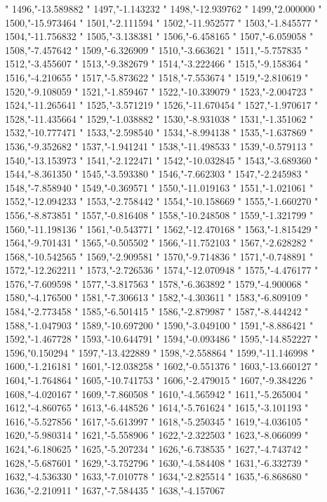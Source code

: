 "
1496,"-13.589882
"
1497,"-1.143232
"
1498,"-12.939762
"
1499,"2.000000
"
1500,"-15.973464
"
1501,"-2.111594
"
1502,"-11.952577
"
1503,"-1.845577
"
1504,"-11.756832
"
1505,"-3.138381
"
1506,"-6.458165
"
1507,"-6.059058
"
1508,"-7.457642
"
1509,"-6.326909
"
1510,"-3.663621
"
1511,"-5.757835
"
1512,"-3.455607
"
1513,"-9.382679
"
1514,"-3.222466
"
1515,"-9.158364
"
1516,"-4.210655
"
1517,"-5.873622
"
1518,"-7.553674
"
1519,"-2.810619
"
1520,"-9.108059
"
1521,"-1.859467
"
1522,"-10.339079
"
1523,"-2.004723
"
1524,"-11.265641
"
1525,"-3.571219
"
1526,"-11.670454
"
1527,"-1.970617
"
1528,"-11.435664
"
1529,"-1.038882
"
1530,"-8.931038
"
1531,"-1.351062
"
1532,"-10.777471
"
1533,"-2.598540
"
1534,"-8.994138
"
1535,"-1.637869
"
1536,"-9.352682
"
1537,"-1.941241
"
1538,"-11.498533
"
1539,"-0.579113
"
1540,"-13.153973
"
1541,"-2.122471
"
1542,"-10.032845
"
1543,"-3.689360
"
1544,"-8.361350
"
1545,"-3.593380
"
1546,"-7.662303
"
1547,"-2.245983
"
1548,"-7.858940
"
1549,"-0.369571
"
1550,"-11.019163
"
1551,"-1.021061
"
1552,"-12.094233
"
1553,"-2.758442
"
1554,"-10.158669
"
1555,"-1.660270
"
1556,"-8.873851
"
1557,"-0.816408
"
1558,"-10.248508
"
1559,"-1.321799
"
1560,"-11.198136
"
1561,"-0.543771
"
1562,"-12.470168
"
1563,"-1.815429
"
1564,"-9.701431
"
1565,"-0.505502
"
1566,"-11.752103
"
1567,"-2.628282
"
1568,"-10.542565
"
1569,"-2.909581
"
1570,"-9.714836
"
1571,"-0.748891
"
1572,"-12.262211
"
1573,"-2.726536
"
1574,"-12.070948
"
1575,"-4.476177
"
1576,"-7.609598
"
1577,"-3.817563
"
1578,"-6.363892
"
1579,"-4.900068
"
1580,"-4.176500
"
1581,"-7.306613
"
1582,"-4.303611
"
1583,"-6.809109
"
1584,"-2.773458
"
1585,"-6.501415
"
1586,"-2.879987
"
1587,"-8.444242
"
1588,"-1.047903
"
1589,"-10.697200
"
1590,"-3.049100
"
1591,"-8.886421
"
1592,"-1.467728
"
1593,"-10.644791
"
1594,"-0.093486
"
1595,"-14.852227
"
1596,"0.150294
"
1597,"-13.422889
"
1598,"-2.558864
"
1599,"-11.146998
"
1600,"-1.216181
"
1601,"-12.038258
"
1602,"-0.551376
"
1603,"-13.660127
"
1604,"-1.764864
"
1605,"-10.741753
"
1606,"-2.479015
"
1607,"-9.384226
"
1608,"-4.020167
"
1609,"-7.860508
"
1610,"-4.565942
"
1611,"-5.265004
"
1612,"-4.860765
"
1613,"-6.448526
"
1614,"-5.761624
"
1615,"-3.101193
"
1616,"-5.527856
"
1617,"-5.613997
"
1618,"-5.250345
"
1619,"-4.036105
"
1620,"-5.980314
"
1621,"-5.558906
"
1622,"-2.322503
"
1623,"-8.066099
"
1624,"-6.180625
"
1625,"-5.207234
"
1626,"-6.738535
"
1627,"-4.743742
"
1628,"-5.687601
"
1629,"-3.752796
"
1630,"-4.584408
"
1631,"-6.332739
"
1632,"-4.536330
"
1633,"-7.010778
"
1634,"-2.825514
"
1635,"-6.868680
"
1636,"-2.210911
"
1637,"-7.584435
"
1638,"-4.157067
